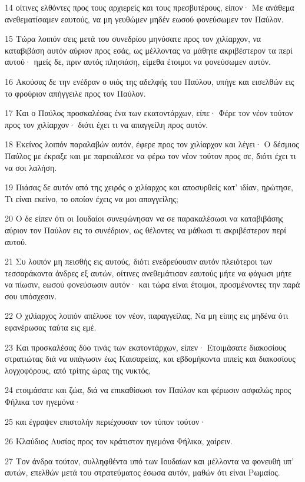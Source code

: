 \par 14 οίτινες ελθόντες προς τους αρχιερείς και τους πρεσβυτέρους, είπον· Με ανάθεμα ανεθεματίσαμεν εαυτούς, να μη γευθώμεν μηδέν εωσού φονεύσωμεν τον Παύλον.
\par 15 Τώρα λοιπόν σεις μετά του συνεδρίου μηνύσατε προς τον χιλίαρχον, να καταβιβάση αυτόν αύριον προς εσάς, ως μέλλοντας να μάθητε ακριβέστερον τα περί αυτού· ημείς δε, πριν αυτός πλησιάση, είμεθα έτοιμοι να φονεύσωμεν αυτόν.
\par 16 Ακούσας δε την ενέδραν ο υιός της αδελφής του Παύλου, υπήγε και εισελθών εις το φρούριον απήγγειλε προς τον Παύλον.
\par 17 Και ο Παύλος προσκαλέσας ένα των εκατοντάρχων, είπε· Φέρε τον νέον τούτον προς τον χιλίαρχον· διότι έχει τι να απαγγείλη προς αυτόν.
\par 18 Εκείνος λοιπόν παραλαβών αυτόν, έφερε προς τον χιλίαρχον και λέγει· Ο δέσμιος Παύλος με έκραξε και με παρεκάλεσε να φέρω τον νέον τούτον προς σε, διότι έχει τι να σοι λαλήση.
\par 19 Πιάσας δε αυτόν από της χειρός ο χιλίαρχος και αποσυρθείς κατ' ιδίαν, ηρώτησε, Τι είναι εκείνο, το οποίον έχεις να μοι απαγγείλης;
\par 20 Ο δε είπεν ότι οι Ιουδαίοι συνεφώνησαν να σε παρακαλέσωσι να καταβιβάσης αύριον τον Παύλον εις το συνέδριον, ως θέλοντες να μάθωσι τι ακριβέστερον περί αυτού.
\par 21 Συ λοιπόν μη πεισθής εις αυτούς, διότι ενεδρεύουσιν αυτόν πλειότεροι των τεσσαράκοντα άνδρες εξ αυτών, οίτινες ανεθεμάτισαν εαυτούς μήτε να φάγωσι μήτε να πίωσιν, εωσού φονεύσωσιν αυτόν· και τώρα είναι έτοιμοι, προσμένοντες την παρά σου υπόσχεσιν.
\par 22 Ο χιλίαρχος λοιπόν απέλυσε τον νέον, παραγγείλας, Να μη είπης εις μηδένα ότι εφανέρωσας ταύτα εις εμέ.
\par 23 Και προσκαλέσας δύο τινάς των εκατοντάρχων, είπεν· Ετοιμάσατε διακοσίους στρατιώτας διά να υπάγωσιν έως Καισαρείας, και εβδομήκοντα ιππείς και διακοσίους λογχοφόρους, από τρίτης ώρας της νυκτός,
\par 24 ετοιμάσατε και ζώα, διά να επικαθίσωσι τον Παύλον και φέρωσιν ασφαλώς προς Φήλικα τον ηγεμόνα·
\par 25 και έγραψεν επιστολήν περιέχουσαν τον τύπον τούτον·
\par 26 Κλαύδιος Λυσίας προς τον κράτιστον ηγεμόνα Φήλικα, χαίρειν.
\par 27 Τον άνδρα τούτον, συλληφθέντα υπό των Ιουδαίων και μέλλοντα να φονευθή υπ' αυτών, επελθών μετά του στρατεύματος έσωσα αυτόν, μαθών ότι είναι Ρωμαίος.
